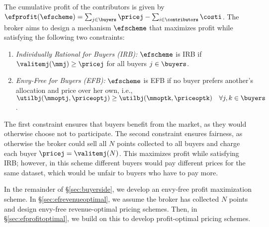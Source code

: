 The cumulative profit of the contributors is given by  
$\efprofit(\efscheme) = \sum_{j \in \buyers} \pricej - \sum_{i \in \contributors} \costi$.
The broker aims to design a mechanism $\efscheme$ that maximizes profit while satisfying the following two constraints:  
\begin{enumerate}[leftmargin=0.2in]
    \item \emph{Individually Rational for Buyers (IRB):}  
    $\efscheme$ is IRB if $\valitemj(\mmj) \geq \pricej$ for all buyers $j \in \buyers$.
    \item \emph{Envy-Free for Buyers (EFB):}  
    $\efscheme$ is EFB if no buyer prefers another's allocation and price over her own, i.e., 
    $\utilbj(\mmoptj, \priceoptj) \geq \utilbj(\mmoptk, \priceoptk) \quad \forall j,k \in \buyers$.
\end{enumerate}  
The first constraint ensures that buyers benefit from the market, as they would otherwise choose not to participate.  
The second constraint ensures fairness, as otherwise the broker could sell all $N$ points collected to all buyers and charge each buyer $\pricej = \valitemj(N)$.
This maximizes profit while satisfying IRB;
however, in this scheme different buyers would pay different prices for the same dataset, which would be unfair to buyers who have to pay more.  

In the remainder of \S\ref{sec:buyerside}, we develop an envy-free profit maximization scheme.  
In \S\ref{sec:efrevenueoptimal}, we assume the broker has collected $N$ points and design envy-free revenue-optimal pricing schemes.  
Then, in \S\ref{sec:efprofitoptimal}, we build on this to develop profit-optimal pricing schemes.






